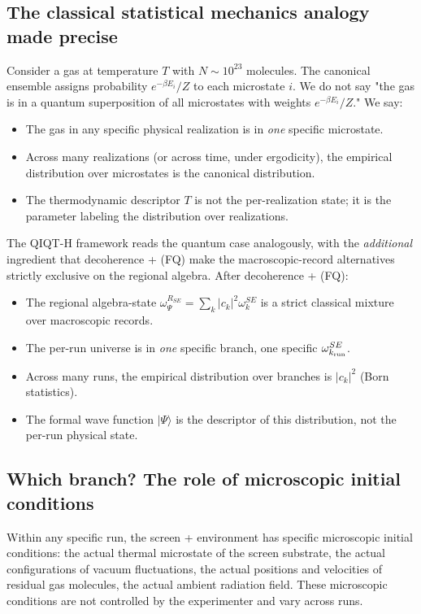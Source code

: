 \documentclass[11pt,a4paper]{article}
\begin{document}
\subsection{The classical statistical mechanics analogy made precise}

Consider a gas at temperature $T$ with $N \sim 10^{23}$ molecules. The canonical ensemble assigns probability $e^{-\beta E_i}/Z$ to each microstate $i$. We do not say "the gas is in a quantum superposition of all microstates with weights $e^{-\beta E_i}/Z$." We say:

\begin{itemize}
  \item The gas in any specific physical realization is in \emph{one} specific microstate.
  \item Across many realizations (or across time, under ergodicity), the empirical distribution over microstates is the canonical distribution.
  \item The thermodynamic descriptor $T$ is not the per-realization state; it is the parameter labeling the distribution over realizations.
\end{itemize}

The QIQT-H framework reads the quantum case analogously, with the \emph{additional} ingredient that decoherence + (FQ) make the macroscopic-record alternatives strictly exclusive on the regional algebra. After decoherence + (FQ):

\begin{itemize}
  \item The regional algebra-state $\omega_\Psi^{R_{SE}} = \sum_k |c_k|^2 \omega_k^{SE}$ is a strict classical mixture over macroscopic records.
  \item The per-run universe is in \emph{one} specific branch, one specific $\omega_{k_{\rm run}}^{SE}$.
  \item Across many runs, the empirical distribution over branches is $|c_k|^2$ (Born statistics).
  \item The formal wave function $|\Psi\rangle$ is the descriptor of this distribution, not the per-run physical state.
\end{itemize}

\subsection{Which branch? The role of microscopic initial conditions}

Within any specific run, the screen + environment has specific microscopic initial conditions: the actual thermal microstate of the screen substrate, the actual configurations of vacuum fluctuations, the actual positions and velocities of residual gas molecules, the actual ambient radiation field. These microscopic conditions are not controlled by the experimenter and vary across runs.
\end{document}
